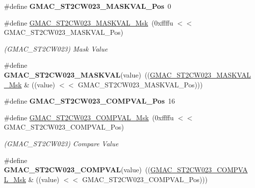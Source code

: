 \begin{DoxyCompactItemize}
\#define {\bfseries G\+M\+A\+C\+\_\+\+S\+T2\+C\+W023\+\_\+\+M\+A\+S\+K\+V\+A\+L\+\_\+\+Pos}~0
\item 
\mbox{\label{group__SAME70__GMAC_ga5ac92cc2d99c164d104a7d96e1fb5f34}} 
\#define \mbox{\hyperlink{group__SAME70__GMAC_ga5ac92cc2d99c164d104a7d96e1fb5f34}{G\+M\+A\+C\+\_\+\+S\+T2\+C\+W023\+\_\+\+M\+A\+S\+K\+V\+A\+L\+\_\+\+Msk}}~(0xffffu $<$$<$ G\+M\+A\+C\+\_\+\+S\+T2\+C\+W023\+\_\+\+M\+A\+S\+K\+V\+A\+L\+\_\+\+Pos)
\begin{DoxyCompactList}\small\item\em (G\+M\+A\+C\+\_\+\+S\+T2\+C\+W023) Mask Value \end{DoxyCompactList}\item 
\mbox{\label{group__SAME70__GMAC_gabad882115fdb92ec4ef90ddd81281554}} 
\#define {\bfseries G\+M\+A\+C\+\_\+\+S\+T2\+C\+W023\+\_\+\+M\+A\+S\+K\+V\+AL}(value)~((\mbox{\hyperlink{group__SAMV71__GMAC_ga5ac92cc2d99c164d104a7d96e1fb5f34}{G\+M\+A\+C\+\_\+\+S\+T2\+C\+W023\+\_\+\+M\+A\+S\+K\+V\+A\+L\+\_\+\+Msk}} \& ((value) $<$$<$ G\+M\+A\+C\+\_\+\+S\+T2\+C\+W023\+\_\+\+M\+A\+S\+K\+V\+A\+L\+\_\+\+Pos)))
\item 
\mbox{\label{group__SAME70__GMAC_ga647470359416c0f2904fb348cc57428b}} 
\#define {\bfseries G\+M\+A\+C\+\_\+\+S\+T2\+C\+W023\+\_\+\+C\+O\+M\+P\+V\+A\+L\+\_\+\+Pos}~16
\item 
\mbox{\label{group__SAME70__GMAC_ga773b07da96c840b43ae93932aa444c7f}} 
\#define \mbox{\hyperlink{group__SAME70__GMAC_ga773b07da96c840b43ae93932aa444c7f}{G\+M\+A\+C\+\_\+\+S\+T2\+C\+W023\+\_\+\+C\+O\+M\+P\+V\+A\+L\+\_\+\+Msk}}~(0xffffu $<$$<$ G\+M\+A\+C\+\_\+\+S\+T2\+C\+W023\+\_\+\+C\+O\+M\+P\+V\+A\+L\+\_\+\+Pos)
\begin{DoxyCompactList}\small\item\em (G\+M\+A\+C\+\_\+\+S\+T2\+C\+W023) Compare Value \end{DoxyCompactList}\item 
\mbox{\label{group__SAME70__GMAC_gaa565a11bc2b6aa89b08a0eb32f76aa8e}} 
\#define {\bfseries G\+M\+A\+C\+\_\+\+S\+T2\+C\+W023\+\_\+\+C\+O\+M\+P\+V\+AL}(value)~((\mbox{\hyperlink{group__SAMV71__GMAC_ga773b07da96c840b43ae93932aa444c7f}{G\+M\+A\+C\+\_\+\+S\+T2\+C\+W023\+\_\+\+C\+O\+M\+P\+V\+A\+L\+\_\+\+Msk}} \& ((value) $<$$<$ G\+M\+A\+C\+\_\+\+S\+T2\+C\+W023\+\_\+\+C\+O\+M\+P\+V\+A\+L\+\_\+\+Pos)))

\end{DoxyCompactItemize}
